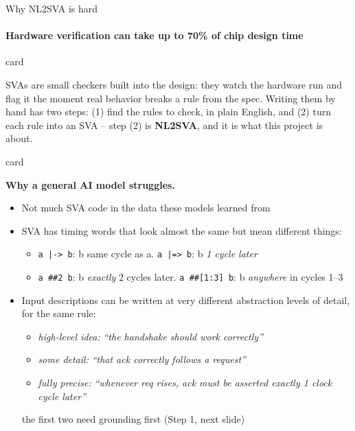 \documentclass[aspectratio=169]{beamer}
\newenvironment{card}[1][\textwidth]{%
  \begin{beamercolorbox}[wd=#1,sep=8pt,rounded=true,shadow=false]{card}
}{%
  \end{beamercolorbox}
}
\begin{document}
\begin{frame}{Why NL2SVA is hard}
  \framesubtitle{Hardware verification can take up to 70\% of chip design time}
  \begin{card}
  \tiny
  SVAs are small checkers built into the design: they watch the hardware
  run and flag it the moment real behavior breaks a rule from the spec.
  Writing them by hand has two steps: (1) find the rules to check, in
  plain English, and (2) turn each rule into an SVA -- step (2) is
  \textbf{NL2SVA}, and it is what this project is about.
  \end{card}
  \vspace{3pt}
  \begin{card}
  \tiny
  \textbf{Why a general AI model struggles.}
  \begin{itemize}
    \item Not much SVA code in the data these models learned from
    \item SVA has timing words that look almost the same but mean
      different things:
      \begin{itemize}
        \item \texttt{a |-> b}: b same cycle as a. \texttt{a |=> b}:
          b \emph{1 cycle later}
        \item \texttt{a \#\#2 b}: b \emph{exactly} 2 cycles later.
          \texttt{a \#\#[1:3] b}: b \emph{anywhere} in cycles 1--3
      \end{itemize}
    \item Input descriptions can be written at very different abstraction
      levels of detail, for the same rule:
      \begin{itemize}
        \item \emph{high-level idea:} \textit{``the handshake should
          work correctly''}
        \item \emph{some detail:} \textit{``that ack correctly follows a
          request''}
        \item \emph{fully precise:} \textit{``whenever req rises, ack
          must be asserted exactly 1 clock cycle later''}
      \end{itemize}
      the first two need grounding first (Step 1, next slide)
  \end{itemize}
  \end{card}
\end{frame}
\end{document}

